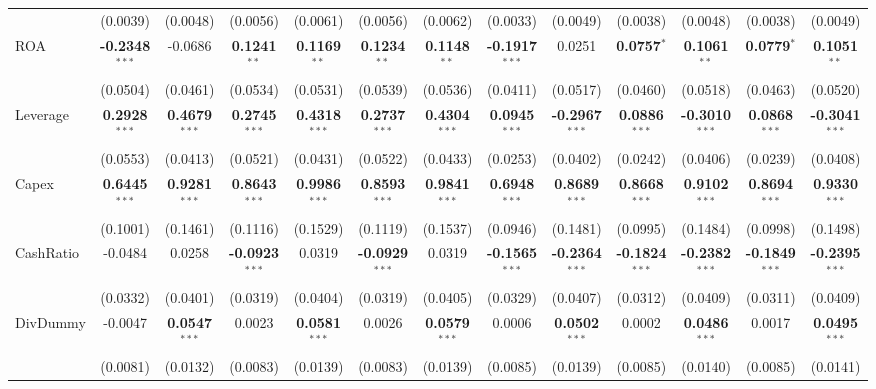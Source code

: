 \documentclass[11pt,a4paper]{article}
\begin{document}
\begin{table}[htbp]
\begin{tabular}{lcccccccccccc}
 & (0.0039) & (0.0048) & (0.0056) & (0.0061) & (0.0056) & (0.0062) & (0.0033) & (0.0049) & (0.0038) & (0.0048) & (0.0038) & (0.0049) \\
ROA & \textbf{-0.2348}$^{***}$ & -0.0686 & \textbf{0.1241}$^{**}$ & \textbf{0.1169}$^{**}$ & \textbf{0.1234}$^{**}$ & \textbf{0.1148}$^{**}$ & \textbf{-0.1917}$^{***}$ & 0.0251 & \textbf{0.0757}$^{*}$ & \textbf{0.1061}$^{**}$ & \textbf{0.0779}$^{*}$ & \textbf{0.1051}$^{**}$ \\
 & (0.0504) & (0.0461) & (0.0534) & (0.0531) & (0.0539) & (0.0536) & (0.0411) & (0.0517) & (0.0460) & (0.0518) & (0.0463) & (0.0520) \\
Leverage & \textbf{0.2928}$^{***}$ & \textbf{0.4679}$^{***}$ & \textbf{0.2745}$^{***}$ & \textbf{0.4318}$^{***}$ & \textbf{0.2737}$^{***}$ & \textbf{0.4304}$^{***}$ & \textbf{0.0945}$^{***}$ & \textbf{-0.2967}$^{***}$ & \textbf{0.0886}$^{***}$ & \textbf{-0.3010}$^{***}$ & \textbf{0.0868}$^{***}$ & \textbf{-0.3041}$^{***}$ \\
 & (0.0553) & (0.0413) & (0.0521) & (0.0431) & (0.0522) & (0.0433) & (0.0253) & (0.0402) & (0.0242) & (0.0406) & (0.0239) & (0.0408) \\
Capex & \textbf{0.6445}$^{***}$ & \textbf{0.9281}$^{***}$ & \textbf{0.8643}$^{***}$ & \textbf{0.9986}$^{***}$ & \textbf{0.8593}$^{***}$ & \textbf{0.9841}$^{***}$ & \textbf{0.6948}$^{***}$ & \textbf{0.8689}$^{***}$ & \textbf{0.8668}$^{***}$ & \textbf{0.9102}$^{***}$ & \textbf{0.8694}$^{***}$ & \textbf{0.9330}$^{***}$ \\
 & (0.1001) & (0.1461) & (0.1116) & (0.1529) & (0.1119) & (0.1537) & (0.0946) & (0.1481) & (0.0995) & (0.1484) & (0.0998) & (0.1498) \\
CashRatio & -0.0484 & 0.0258 & \textbf{-0.0923}$^{***}$ & 0.0319 & \textbf{-0.0929}$^{***}$ & 0.0319 & \textbf{-0.1565}$^{***}$ & \textbf{-0.2364}$^{***}$ & \textbf{-0.1824}$^{***}$ & \textbf{-0.2382}$^{***}$ & \textbf{-0.1849}$^{***}$ & \textbf{-0.2395}$^{***}$ \\
 & (0.0332) & (0.0401) & (0.0319) & (0.0404) & (0.0319) & (0.0405) & (0.0329) & (0.0407) & (0.0312) & (0.0409) & (0.0311) & (0.0409) \\
DivDummy & -0.0047 & \textbf{0.0547}$^{***}$ & 0.0023 & \textbf{0.0581}$^{***}$ & 0.0026 & \textbf{0.0579}$^{***}$ & 0.0006 & \textbf{0.0502}$^{***}$ & 0.0002 & \textbf{0.0486}$^{***}$ & 0.0017 & \textbf{0.0495}$^{***}$ \\
 & (0.0081) & (0.0132) & (0.0083) & (0.0139) & (0.0083) & (0.0139) & (0.0085) & (0.0139) & (0.0085) & (0.0140) & (0.0085) & (0.0141) \\

\end{tabular}
\end{table}
\end{document}
